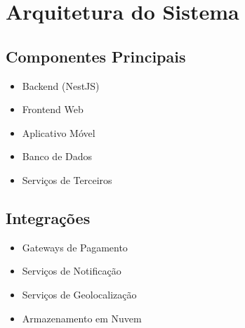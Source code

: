 \section{Arquitetura do Sistema}
\subsection{Componentes Principais}
\begin{itemize}
    \item Backend (NestJS)
    \item Frontend Web
    \item Aplicativo Móvel
    \item Banco de Dados
    \item Serviços de Terceiros
\end{itemize}

\subsection{Integrações}
\begin{itemize}
    \item Gateways de Pagamento
    \item Serviços de Notificação
    \item Serviços de Geolocalização
    \item Armazenamento em Nuvem
\end{itemize} 